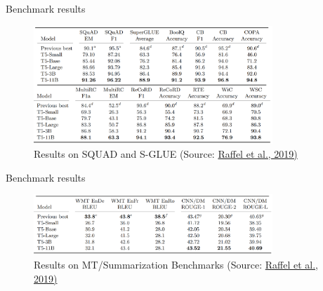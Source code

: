 
\begin{frame}{Benchmark results}

\vfill

	\begin{figure}
		\centering
		\includegraphics[width = 9cm]{figure/t5-squad-sglue.png}\\ 
		\footnotesize{Results on SQUAD and S-GLUE (Source:} \href{https://arxiv.org/pdf/1910.10683.pdf}{\footnotesize Raffel et al., 2019)}
	\end{figure}
	
\vfill

\end{frame}


\begin{frame}{Benchmark results}

\vfill

	\begin{figure}
		\centering
		\includegraphics[width = 9cm]{figure/t5-mt.png}\\ 
		\footnotesize{Results on MT/Summarization Benchmarks (Source:} \href{https://arxiv.org/pdf/1910.10683.pdf}{\footnotesize Raffel et al., 2019)}
	\end{figure}
	
\vfill

\end{frame}


